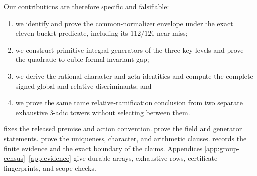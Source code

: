 Our contributions are therefore specific and falsifiable:
\begin{enumerate}[leftmargin=2.2em]
\item we identify and prove the common-normalizer envelope under the exact
eleven-bucket predicate, including its $112/120$ near-miss;
\item we construct primitive integral generators of the three key levels and
prove the quadratic-to-cubic formal invariant gap;
\item we derive the rational character and zeta identities and compute the
complete signed global and relative discriminants; and
\item we prove the same tame relative-ramification conclusion from two
separate exhaustive $3$-adic towers without selecting between them.
\end{enumerate}



 fixes the released premise and action convention.
 prove the field and generator statements.
 prove the uniqueness,
character, and arithmetic clauses.   records the
finite evidence and the exact boundary of the claims.  Appendices
\ref{app:group-census}--\ref{app:evidence} give durable arrays, exhaustive
rows, certificate fingerprints, and scope checks.

